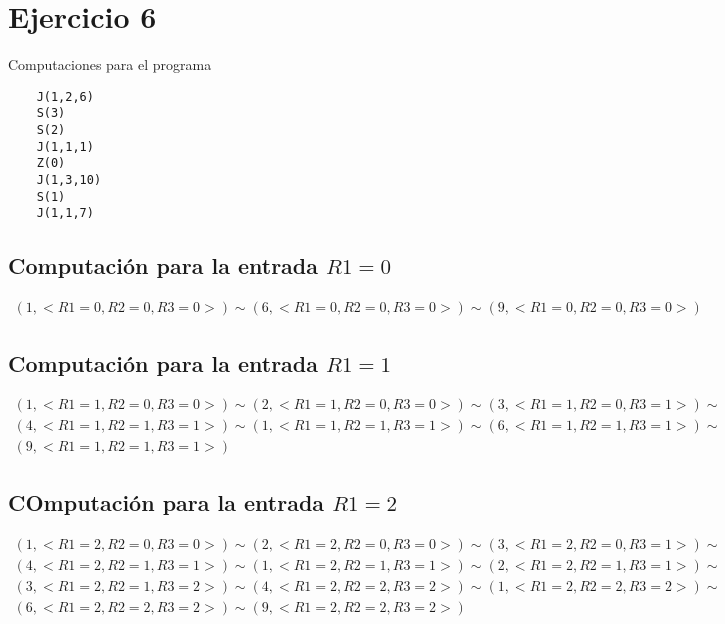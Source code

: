 \section{Ejercicio 6}
	Computaciones para el programa
	\begin{verbatim}
	J(1,2,6)
	S(3)
	S(2)
	J(1,1,1)
	Z(0)
	J(1,3,10)
	S(1)
	J(1,1,7)
	\end{verbatim}
	\subsection{Computación para la entrada $R1=0$}
	\begin{equation*}\begin{gathered}
	(1, <R1=0, R2=0, R3=0>) \sim (6, <R1=0, R2=0, R3=0>) \sim (9, <R1=0, R2=0, R3=0>)
	\end{gathered}\end{equation*}
	\subsection{Computación para la entrada $R1=1$}
	\begin{equation*}\begin{gathered}
	(1, <R1=1, R2=0, R3=0>) \sim (2, <R1=1, R2=0, R3=0>) \sim (3, <R1=1, R2=0, R3=1>) \sim\\
	(4, <R1=1, R2=1, R3=1>) \sim (1, <R1=1, R2=1, R3=1>) \sim (6, <R1=1, R2=1, R3=1>) \sim\\
	(9, <R1=1, R2=1, R3=1>)
	\end{gathered}\end{equation*}
	\subsection{COmputación para la entrada $R1=2$}
	\begin{equation*}\begin{gathered}
	(1, <R1=2, R2=0, R3=0>) \sim (2, <R1=2, R2=0, R3=0>) \sim (3, <R1=2, R2=0, R3=1>) \sim\\
	(4, <R1=2, R2=1, R3=1>) \sim (1, <R1=2, R2=1, R3=1>) \sim (2, <R1=2, R2=1, R3=1>) \sim\\
	(3, <R1=2, R2=1, R3=2>) \sim (4, <R1=2, R2=2, R3=2>) \sim (1, <R1=2, R2=2, R3=2>) \sim\\
	(6, <R1=2, R2=2, R3=2>) \sim (9, <R1=2, R2=2, R3=2>)
	\end{gathered}\end{equation*}
